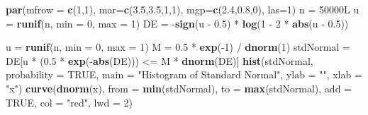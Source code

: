 \documentclass[11pt,]{article}
\newenvironment{Shaded}{\begin{snugshade}}{\end{snugshade}}
\newcommand{\KeywordTok}[1]{\textcolor[rgb]{0.13,0.29,0.53}{\textbf{{#1}}}}
\newcommand{\DataTypeTok}[1]{\textcolor[rgb]{0.13,0.29,0.53}{{#1}}}
\newcommand{\DecValTok}[1]{\textcolor[rgb]{0.00,0.00,0.81}{{#1}}}
\newcommand{\FloatTok}[1]{\textcolor[rgb]{0.00,0.00,0.81}{{#1}}}
\newcommand{\StringTok}[1]{\textcolor[rgb]{0.31,0.60,0.02}{{#1}}}
\newcommand{\OtherTok}[1]{\textcolor[rgb]{0.56,0.35,0.01}{{#1}}}
\newcommand{\NormalTok}[1]{{#1}}
\begin{document}
\begin{Shaded}
\begin{Highlighting}[]
\KeywordTok{par}\NormalTok{(}\DataTypeTok{mfrow =} \KeywordTok{c}\NormalTok{(}\DecValTok{1}\NormalTok{,}\DecValTok{1}\NormalTok{), }\DataTypeTok{mar=}\KeywordTok{c}\NormalTok{(}\FloatTok{3.5}\NormalTok{,}\FloatTok{3.5}\NormalTok{,}\DecValTok{1}\NormalTok{,}\DecValTok{1}\NormalTok{), }\DataTypeTok{mgp=}\KeywordTok{c}\NormalTok{(}\FloatTok{2.4}\NormalTok{,}\FloatTok{0.8}\NormalTok{,}\DecValTok{0}\NormalTok{), }\DataTypeTok{las=}\DecValTok{1}\NormalTok{)}
\NormalTok{n =}\StringTok{ }\NormalTok{50000L}
\NormalTok{u =}\StringTok{ }\KeywordTok{runif}\NormalTok{(n, }\DataTypeTok{min =} \DecValTok{0}\NormalTok{, }\DataTypeTok{max =} \DecValTok{1}\NormalTok{)}
\NormalTok{DE =}\StringTok{ }\NormalTok{-}\KeywordTok{sign}\NormalTok{(u -}\StringTok{ }\FloatTok{0.5}\NormalTok{) *}\StringTok{ }\KeywordTok{log}\NormalTok{(}\DecValTok{1} \NormalTok{-}\StringTok{ }\DecValTok{2} \NormalTok{*}\StringTok{ }\KeywordTok{abs}\NormalTok{(u -}\StringTok{ }\FloatTok{0.5}\NormalTok{))}

\NormalTok{u =}\StringTok{ }\KeywordTok{runif}\NormalTok{(n, }\DataTypeTok{min =} \DecValTok{0}\NormalTok{, }\DataTypeTok{max =} \DecValTok{1}\NormalTok{)}
\NormalTok{M =}\StringTok{ }\FloatTok{0.5} \NormalTok{*}\StringTok{ }\KeywordTok{exp}\NormalTok{(-}\DecValTok{1}\NormalTok{) /}\StringTok{ }\KeywordTok{dnorm}\NormalTok{(}\DecValTok{1}\NormalTok{)}
\NormalTok{stdNormal =}\StringTok{ }\NormalTok{DE[u *}\StringTok{ }\NormalTok{(}\FloatTok{0.5} \NormalTok{*}\StringTok{ }\KeywordTok{exp}\NormalTok{(-}\KeywordTok{abs}\NormalTok{(DE))) <=}\StringTok{ }\NormalTok{M *}\StringTok{ }\KeywordTok{dnorm}\NormalTok{(DE)]}
\KeywordTok{hist}\NormalTok{(stdNormal, }\DataTypeTok{probability =} \OtherTok{TRUE}\NormalTok{,}
     \DataTypeTok{main =} \StringTok{"Histogram of Standard Normal"}\NormalTok{, }\DataTypeTok{ylab =} \StringTok{""}\NormalTok{, }\DataTypeTok{xlab =} \StringTok{"x"}\NormalTok{)}
\KeywordTok{curve}\NormalTok{(}\KeywordTok{dnorm}\NormalTok{(x), }\DataTypeTok{from =} \KeywordTok{min}\NormalTok{(stdNormal), }\DataTypeTok{to =} \KeywordTok{max}\NormalTok{(stdNormal),}
      \DataTypeTok{add =} \OtherTok{TRUE}\NormalTok{, }\DataTypeTok{col =} \StringTok{"red"}\NormalTok{, }\DataTypeTok{lwd =} \DecValTok{2}\NormalTok{)}
\end{Highlighting}
\end{Shaded}
\end{document}
